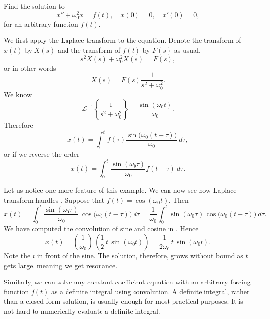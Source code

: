 \begin{example}
Find the solution to
\begin{equation*}
x'' + \omega_0^2 x = f(t) , \quad x(0) = 0, \quad x'(0) = 0 ,
\end{equation*}
for an arbitrary function $f(t)$.

We first apply the Laplace transform to the equation.  Denote
the transform of $x(t)$ by $X(s)$ and the transform of $f(t)$ by
$F(s)$ as usual.
\begin{equation*}
s^2 X(s) + \omega_0^2 X(s) = F(s) ,
\end{equation*}
or in other words
\begin{equation*}
X(s) = F(s) \frac{1}{s^2+ \omega_0^2} .
\end{equation*}
We know
\begin{equation*}
{\mathcal{L}}^{-1} \left\{
\frac{1}{s^2+ \omega_0^2}
\right\} = 
\frac{\sin (\omega_0 t)}{\omega_0} .
\end{equation*}
Therefore,
\begin{equation*}
x(t) = 
\int_0^t
f(\tau) 
\frac{\sin \bigl( \omega_0 (t-\tau) \bigr)}{\omega_0} ~ d\tau ,
\end{equation*}
or if we reverse the order
\begin{equation*}
x(t) = 
\int_0^t
\frac{\sin (\omega_0 \tau)}{\omega_0}
f(t-\tau) ~ d\tau .
\end{equation*}
\end{example}

Let us notice one more feature of this example.
We can now see how Laplace transform
handles .  Suppose that $f(t) =
\cos (\omega_0 t)$.  Then
\begin{equation*}
x(t) = 
\int_0^t
\frac{\sin (\omega_0 \tau)}{\omega_0} \,
\cos \bigl( \omega_0 (t-\tau) \bigr) ~ d\tau
=
\frac{1}{\omega_0}
\int_0^t
\sin ( \omega_0 \tau ) \,
\cos \bigl(\omega_0 (t-\tau) \bigr) ~ d\tau .
\end{equation*}
We have computed the convolution of sine and cosine in
.  Hence
\begin{equation*}
x(t) =
\left(
\frac{1}{\omega_0}
\right) \,
\left(
\frac{1}{2} \,
t \,
\sin ( \omega_0 t )
\right)
=
\frac{1}{2 \omega_0} \,
t
\,
\sin ( \omega_0 t ).
\end{equation*}
Note the $t$ in front of the sine.  The solution, therefore, grows without
bound as $t$ gets large, meaning we get resonance.

Similarly,
we can solve any constant coefficient equation with an arbitrary forcing
function $f(t)$ as a definite integral using convolution.
A definite integral, rather than a closed form solution, is usually enough
for most practical purposes.  It is
not hard to numerically evaluate a definite integral.

